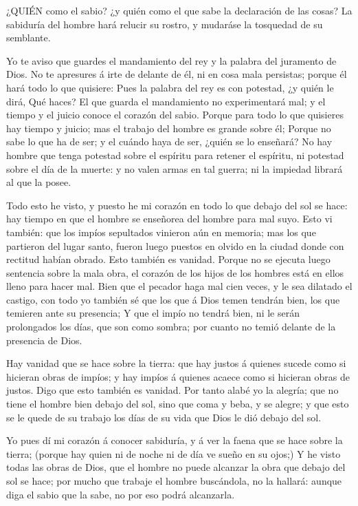  ¿QUIÉN como el sabio? ¿y quién como el que sabe la
declaración de las cosas? La sabiduría del hombre hará relucir su
rostro, y mudaráse la tosquedad de su semblante.

 Yo te aviso que guardes el mandamiento del rey y la palabra
del juramento de Dios.  No te apresures á irte de delante de
él, ni en cosa mala persistas; porque él hará todo lo que quisiere:
 Pues la palabra del rey es con potestad, ¿y quién le dirá,
Qué haces?  El que guarda el mandamiento no experimentará
mal; y el tiempo y el juicio conoce el corazón del sabio. 
Porque para todo lo que quisieres hay tiempo y juicio; mas el trabajo
del hombre es grande sobre él;  Porque no sabe lo que ha de
ser; y el cuándo haya de ser, ¿quién se lo enseñará?  No hay
hombre que tenga potestad sobre el espíritu para retener el espíritu, ni
potestad sobre el día de la muerte: y no valen armas en tal guerra; ni
la impiedad librará al que la posee.

 Todo esto he visto, y puesto he mi corazón en todo lo que
debajo del sol se hace: hay tiempo en que el hombre se enseñorea del
hombre para mal suyo.  Esto vi también: que los impíos
sepultados vinieron aún en memoria; mas los que partieron del lugar
santo, fueron luego puestos en olvido en la ciudad donde con rectitud
habían obrado. Esto también es vanidad.  Porque no se
ejecuta luego sentencia sobre la mala obra, el corazón de los hijos de
los hombres está en ellos lleno para hacer mal.  Bien que
el pecador haga mal cien veces, y le sea dilatado el castigo, con todo
yo también sé que los que á Dios temen tendrán bien, los que temieren
ante su presencia;  Y que el impío no tendrá bien, ni le
serán prolongados los días, que son como sombra; por cuanto no temió
delante de la presencia de Dios.

 Hay vanidad que se hace sobre la tierra: que hay justos á
quienes sucede como si hicieran obras de impíos; y hay impíos á quienes
acaece como si hicieran obras de justos. Digo que esto también es
vanidad.  Por tanto alabé yo la alegría; que no tiene el
hombre bien debajo del sol, sino que coma y beba, y se alegre; y que
esto se le quede de su trabajo los días de su vida que Dios le dió
debajo del sol.

 Yo pues dí mi corazón á conocer sabiduría, y á ver la
faena que se hace sobre la tierra; (porque hay quien ni de noche ni de
día ve sueño en su ojos;)  Y he visto todas las obras de
Dios, que el hombre no puede alcanzar la obra que debajo del sol se
hace; por mucho que trabaje el hombre buscándola, no la hallará: aunque
diga el sabio que la sabe, no por eso podrá alcanzarla.

